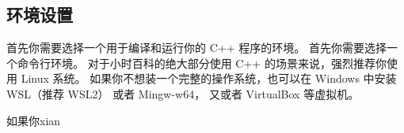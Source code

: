 
\subsection{环境设置}
首先你需要选择一个用于编译和运行你的 C++ 程序的环境。 首先你需要选择一个命令行环境。 对于小时百科的绝大部分使用 C++ 的场景来说，强烈推荐你使用 Linux 系统。 如果你不想装一个完整的操作系统，也可以在 Windows 中安装 WSL（推荐 WSL2） 或者 Mingw-w64， 又或者 VirtualBox 等虚拟机。

如果你xian
